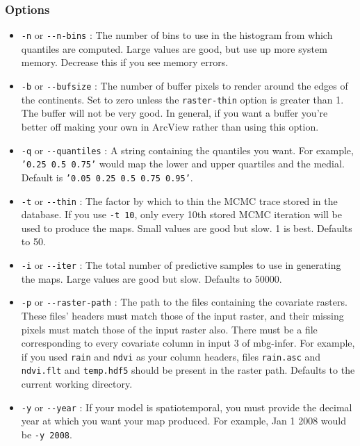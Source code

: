 \subsubsection{Options%
}
%
\begin{itemize}

\item \texttt{-n} or \texttt{-{}-n-bins} : The number of bins to use in the histogram from which quantiles
are computed. Large values are good, but use up more system memory. Decrease this if you
see memory errors.

\item \texttt{-b} or \texttt{-{}-bufsize} : The number of buffer pixels to render around the edges of the
continents. Set to zero unless the \texttt{raster-thin} option is greater than 1. The buffer
will not be very good. In general, if you want a buffer you're better off making your
own in ArcView rather than using this option.

\item \texttt{-q} or \texttt{-{}-quantiles} : A string containing the quantiles you want. For example,
\texttt{'0.25 0.5 0.75'} would map the lower and upper quartiles and the medial. Default is
\texttt{'0.05 0.25 0.5 0.75 0.95'}.

\item \texttt{-t} or \texttt{-{}-thin} : The factor by which to thin the MCMC trace stored in the database.
If you use \texttt{-t 10}, only every 10th stored MCMC iteration will be used to produce the maps.
Small values are good but slow. 1 is best. Defaults to 50.

\item \texttt{-i} or \texttt{-{}-iter} : The total number of predictive samples to use in generating the maps.
Large values are good but slow. Defaults to 50000.

\item \texttt{-p} or \texttt{-{}-raster-path} : The path to the files containing the covariate rasters. These
files' headers must match those of the input raster, and their missing pixels must match
those of the input raster also. There must be a file corresponding to every covariate column
in input 3 of mbg-infer. For example, if you used \texttt{rain} and \texttt{ndvi} as your column headers,
files \texttt{rain.asc} and \texttt{ndvi.flt} and \texttt{temp.hdf5} should be present in the raster path.
Defaults to the current working directory.

\item \texttt{-y} or \texttt{-{}-year} : If your model is spatiotemporal, you must provide the decimal year at
which you want your map produced. For example, Jan 1 2008 would be \texttt{-y 2008}.


\end{itemize}

